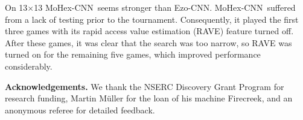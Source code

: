 \documentclass{icga}
\def\Ec{\mbox{\sc Ezo-CNN}}
\def\Mc{\mbox{\sc MoHex-CNN}}
\begin{document}
On 13$\times$13 \Mc\ seems stronger than \Ec.
\Mc\ suffered from a lack of testing prior to the tournament.
Consequently, it played the first three games with its rapid access value estimation (RAVE)
feature turned off. After these games, it was clear that the search
was too narrow, so RAVE was turned on for the remaining five games, which improved
performance considerably.

{\bf Acknowledgements.}
We thank the NSERC Discovery Grant Program for research funding,
Martin M\"{u}ller for the loan of his machine Firecreek, and
an anonymous referee for detailed feedback.

\end{document}
